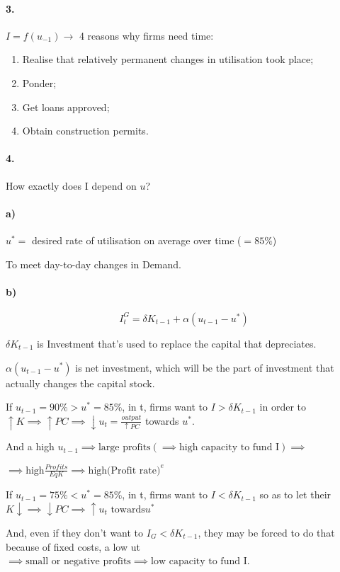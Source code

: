 \documentclass{report}
\begin{document}
\paragraph{3.} $I=f(u_{-1}) \rightarrow$ 4 reasons why firms need time:

\begin{enumerate}
    \item Realise that relatively permanent changes in utilisation took place; 
    \item Ponder; 
    \item Get loans approved; 
    \item Obtain construction permits.
\end{enumerate}

\paragraph{4.} How exactly does I depend on $u$? 

\paragraph{a)} $u^*=$ desired rate of utilisation on average over time ($=85\%$)

To meet day-to-day changes in Demand. 

\paragraph{b)}

\begin{equation*}
    I^G_t=\delta K_{t-1}+\alpha(u_{t-1}-u^*)
\end{equation*}

$\delta K_{t-1}$ is Investment that's used to replace the capital that depreciates. 

$\alpha(u_{t-1}-u^*)$ is net investment, which will be the part of investment that actually changes the capital stock. 

\begin{description}
    \item If $u_{t-1}=90\%>u^*=85\%$, in t, firms want to $I>\delta K_{t-1}$ in order to $\uparrow K \implies \uparrow PC \implies \downarrow u_t=\frac{output}{\uparrow PC}$ towards $u^*$.
    
    And a high $u_{t-1} \implies \text{large profits} (\implies \text{high capacity to fund I}) \implies$ 
    
    $\implies \text{high} \frac{Profits}{EqK} \implies \text{high} \big(\text{Profit rate} \big)^e$
    
    \item  If $u_{t-1}=75\%<u^*=85\%$, in t, firms want to $I<\delta K_{t-1}$ so as to let their $K \downarrow \implies \downarrow PC \implies \uparrow u_t \text{ towards} u^*$
    
    And, even if they don't want to $I_G<\delta K_{t-1}$, they may be forced to do that because of fixed costs, a low ut $\implies \text{small or negative profits} \implies \text{low capacity to fund I}$.
\end{description}
\end{document}
